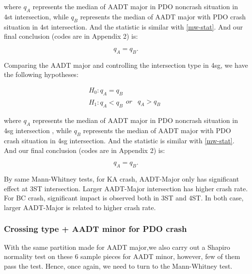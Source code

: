 \documentclass[11pt]{scrartcl} %
\begin{document}
where $q_A$ represents the median of AADT major in PDO noncrash situation in 4st intersection, while $q_B$ represents the median of AADT major with PDO crash situation in 4st intersection. And the statistic is similar with \eqref{mw-stat}. And our final conclusion (codes are in Appendix 2) is:

\begin{equation*}
{q_A} = {q_B}.
\end{equation*}

\par

Comparing the AADT major and controlling the intersection type in 4sg, we have the following hypotheses:

\begin{equation*}
\begin{array}{l}
{H_0}:{q_A} = {q_B}\\
{H_1}:{q_A} < {q_B}\begin{array}{*{20}{c}}
{or}&{{q_A} > {q_B}}
\end{array}
\end{array}
\end{equation*}

where $q_A$ represents the median of AADT major in PDO noncrash situation in 4sg intersection , while $q_B$ represents the median of AADT major with PDO crash situation in 4sg intersection. And the statistic is similar with \eqref{mw-stat}. And our final conclusion (codes are in Appendix 2) is:

\begin{equation*}
{q_A} = {q_B}.
\end{equation*}

By same Mann-Whitney tests, for KA crash, AADT-Major only has significant effect at 3ST intersection. Larger AADT-Major intersection has higher crash rate. For BC crash, significant impact is observed both in 3ST and 4ST. In both case, larger AADT-Major is related to higher crash rate.

\subsubsection{Crossing type + AADT minor for PDO crash}

With the same partition made for AADT major,we also carry out a Shapiro normality test on these 6 sample pieces for AADT minor, however, few of them pass the test. Hence, once again, we need to turn to the Mann-Whitney test.

\par
\end{document}
